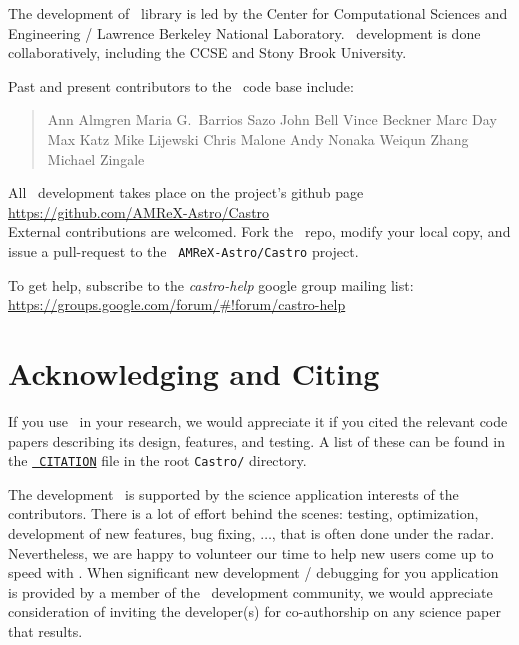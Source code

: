 The development of \amrex\ library is led by the
Center for Computational Sciences and Engineering / Lawrence Berkeley
National Laboratory.  \castro\ development is done collaboratively,
including the CCSE and Stony Brook University.

Past and present contributors to the \castro\ code base include:

\begin{quote}
Ann Almgren\newline
Maria G.\ Barrios Sazo\newline
John Bell\newline
Vince Beckner\newline
Marc Day\newline
Max Katz\newline
Mike Lijewski\newline
Chris Malone\newline
Andy Nonaka\newline
Weiqun Zhang\newline
Michael Zingale
\end{quote}

All \castro\ development takes place on the project's github page\\[0.5em]
\url{https://github.com/AMReX-Astro/Castro}\\[0.5em]
External contributions are welcomed.  Fork the \castro\ repo, modify
your local copy, and issue a pull-request to the {\tt
AMReX-Astro/Castro} project.

To get help, subscribe to the {\em castro-help} google group mailing list:
\url{https://groups.google.com/forum/#!forum/castro-help}


\section*{Acknowledging and Citing \castro}

If you use \castro\ in your research, we would appreciate it if you
cited the relevant code papers describing its design, features, and
testing.  A list of these can be found in the
\href{https://github.com/AMReX-Astro/Castro/blob/master/CITATION}{\tt
  CITATION} file in the root {\tt Castro/} directory.

The development \castro\ is supported by the science application
interests of the contributors.  There is a lot of effort behind the
scenes: testing, optimization, development of new features, bug
fixing, $\ldots$, that is often done under the radar.  Nevertheless,
we are happy to volunteer our time to help new users come up to speed
with \castro.  When significant new development / debugging for you
application is provided by a member of the \castro\ development
community, we would appreciate consideration of inviting the
developer(s) for co-authorship on any science paper that results.
